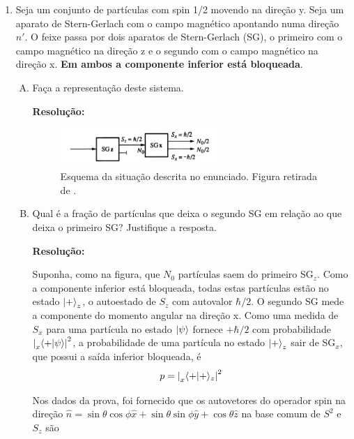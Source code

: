 \documentclass[a4paper, 12pt, notitlepage]{article}
\begin{document}
\begin{enumerate}
\begin{enumerate}[(A)]
  
  
\end{enumerate}

\item Seja um conjunto de partículas com spin 1/2 movendo na direção y. Seja um aparato de Stern-Gerlach com o campo magnético apontando numa direção $\hat{n}'$. O feixe passa por dois aparatos de Stern-Gerlach (SG), o primeiro com o campo magnético na direção z e o segundo com o campo magnético na direção x. \textbf{Em ambos a componente inferior está bloqueada}.

\begin{enumerate}[(A)]
  \item Faça a representação deste sistema.
  
  \textbf{Resolução:}
    \begin{figure}[H]
    \centering
    \includegraphics[width=0.6\textwidth]{2SGs.png}
    \caption{Esquema da situação descrita no enunciado. Figura retirada de \cite{townsend}.}
    \label{fig:2sg}
  \end{figure}
    
  \item Qual é a fração de partículas que deixa o segundo SG em relação ao que deixa o primeiro SG? Justifique a resposta.

  \textbf{Resolução:}
  
  Suponha, como na figura, que $N_0$ partículas saem do primeiro SG$_z$. Como a componente inferior está bloqueada, todas estas partículas estão no estado $\ket{+}_z$, o autoestado de $S_z$ com autovalor $\hbar/2$.
  O segundo SG mede a componente do momento angular na direção x. Como uma medida de $S_x$ para uma partícula no estado $\ket{\psi}$ fornece $+\hbar/2$ com probabilidade $\left|\prescript{}{x}{\left\langle +|\psi\right\rangle}\right|^2$, a probabilidade de uma partícula no estado $\ket{+}_z$ sair de SG$_x$, que possui a saída inferior bloqueada, é 
  \[
  p = \left|\prescript{}{x}{\left\langle +|+\right\rangle}_{z}\right|^2 
  \]

  Nos dados da prova, foi fornecido que os autovetores do operador spin na direção $\hat{n} = \sin \theta \cos \phi \hat{x} + \sin \theta \sin \phi \hat{y} + \cos \theta \hat{z}$ na base comum de $S^2$ e $S_z$ são


\end{enumerate}
\end{enumerate}
\end{document}
